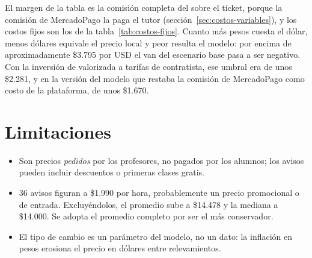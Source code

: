 El margen de la tabla es la comisión completa del \comision{} sobre el
ticket, porque la comisión de MercadoPago la paga el tutor
(sección~\ref{sec:costos-variables}), y los costos fijos son los de la
tabla~\ref{tab:costos-fijos}. Cuanto más pesos cuesta el dólar, menos
dólares equivale el precio local y peor resulta el modelo: por encima de
aproximadamente \$3.795 por USD el \gls{van} del escenario base pasa a ser
negativo. Con la inversión de  valorizada a tarifas de
contratista, ese umbral era de unos \$2.281, y en la versión del modelo
que restaba la comisión de MercadoPago como costo de la plataforma, de
unos \$1.670.

\section{Limitaciones}

\begin{itemize}
    \item Son precios \emph{pedidos} por los profesores, no pagados por los
          alumnos; los avisos pueden incluir descuentos o primeras clases
          gratis.
    \item 36 avisos figuran a \$1.990 por hora, probablemente un precio
          promocional o de entrada. Excluyéndolos, el promedio sube a
          \$14.478 y la mediana a \$14.000. Se adopta el promedio completo
          por ser el más conservador.
    \item El tipo de cambio es un parámetro del modelo, no un dato: la
          inflación en pesos erosiona el precio en dólares entre
          relevamientos.
\end{itemize}
